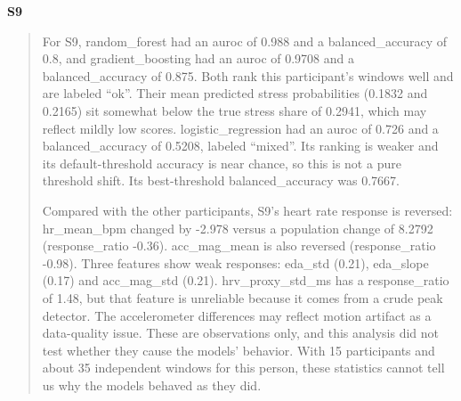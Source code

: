 \documentclass[11pt]{article}
\begin{document}
\textbf{S9}

\begin{quote}
For S9, random\_forest had an auroc of 0.988 and a balanced\_accuracy of
0.8, and gradient\_boosting had an auroc of 0.9708 and a
balanced\_accuracy of 0.875. Both rank this participant's windows well
and are labeled ``ok''. Their mean predicted stress probabilities
(0.1832 and 0.2165) sit somewhat below the true stress share of 0.2941,
which may reflect mildly low scores. logistic\_regression had an auroc
of 0.726 and a balanced\_accuracy of 0.5208, labeled ``mixed''. Its
ranking is weaker and its default-threshold accuracy is near chance, so
this is not a pure threshold shift. Its best-threshold
balanced\_accuracy was 0.7667.

Compared with the other participants, S9's heart rate response is
reversed: hr\_mean\_bpm changed by -2.978 versus a population change of
8.2792 (response\_ratio -0.36). acc\_mag\_mean is also reversed
(response\_ratio -0.98). Three features show weak responses: eda\_std
(0.21), eda\_slope (0.17) and acc\_mag\_std (0.21). hrv\_proxy\_std\_ms
has a response\_ratio of 1.48, but that feature is unreliable because it
comes from a crude peak detector. The accelerometer differences may
reflect motion artifact as a data-quality issue. These are observations
only, and this analysis did not test whether they cause the models'
behavior. With 15 participants and about 35 independent windows for this
person, these statistics cannot tell us why the models behaved as they
did.
\end{quote}
\end{document}
